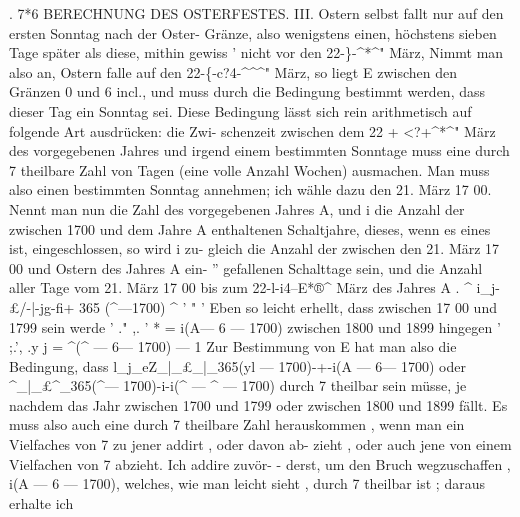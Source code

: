 \documentclass[12pt,a4paper]{article}
\begin{document}
\newpage

.    7*6  BERECHNUNG  DES  OSTERFESTES.
III.  Ostern  selbst  fallt  nur  auf  den  ersten  Sonntag  nach  der  Oster- Gränze,
also  wenigstens  einen,  höchstens  sieben  Tage  später  als  diese,  mithin  gewiss  '
nicht  vor  den  22-\}-\^{}*\^{}"  März,  Nimmt  man  also  an,  Ostern  falle  auf  den
22-\{-c?4-\^{}\^{}\^{}"  März,  so  liegt  E  zwischen  den  Gränzen  0  und  6  incl.,  und  muss
durch  die  Bedingung  bestimmt  werden,  dass  dieser  Tag  ein  Sonntag  sei.  Diese
Bedingung  lässt  sich  rein  arithmetisch  auf  folgende  Art  ausdrücken:  die  Zwi-  
schenzeit  zwischen  dem  22  +  <?+\^{}*\^{}"  März  des  vorgegebenen  Jahres  und  irgend
einem  bestimmten  Sonntage  muss  eine  durch  7  theilbare  Zahl  von  Tagen  (eine
volle  Anzahl  Wochen)  ausmachen.  Man  muss  also  einen  bestimmten  Sonntag
annehmen;  ich  wähle  dazu  den  21.  März  17  00.  Nennt  man  nun  die  Zahl  des
vorgegebenen  Jahres  A,  und  i  die  Anzahl  der  zwischen  1700  und  dem  Jahre  A
enthaltenen  Schaltjahre,  dieses,  wenn  es  eines  ist,  eingeschlossen,  so  wird  i  zu-
gleich die  Anzahl  der  zwischen  den  21.  März  17  00  und  Ostern  des  Jahres  A  ein-
''  gefallenen  Schalttage  sein,  und  die  Anzahl  aller  Tage  vom  21.  März  17  00  bis
zum  22-l-i4--E*®\^{}  März  des  Jahres  A     .
  \^{}  i\_j-£/-|-jg-fi+ 365  (\^{}---1700)  \^{}  '
"       '     
Eben  so  leicht  erhellt,  dass  zwischen  17  00  und  1799  sein  werde
'  ."    ,.  '       *  =  i(A--- 6  --- 1700)
zwischen   1800  und  1899  hingegen  '
;.',     .y     j  =  \^{}(\^{}  --- 6--- 1700)  --- 1
Zur  Bestimmung  von  E  hat  man  also  die  Bedingung,  dass
l\_j\_eZ\_|\_£\_|\_365(yl  --- 1700)-+-i(A  --- 6--- 1700)
oder
\^{}\_|\_£\^{}\_365(\^{}--- 1700)-i-i(\^{}  --- \^{}  --- 1700)
durch  7  theilbar  sein  müsse,  je  nachdem  das  Jahr  zwischen  1700  und  1799  oder
zwischen  1800  und  1899  fällt.  Es  muss  also  auch  eine  durch  7  theilbare  Zahl
herauskommen ,  wenn  man  ein  Vielfaches  von  7  zu  jener  addirt ,  oder  davon  ab-
zieht ,  oder  auch  jene  von  einem  Vielfachen  von  7  abzieht.  Ich  addire  zuvör-
-  derst,  um  den  Bruch  wegzuschaffen ,  i(A  --- 6  --- 1700),  welches,  wie  man  leicht
sieht ,   durch  7   theilbar  ist ;  daraus  erhalte  ich

\newpage
\end{document}
